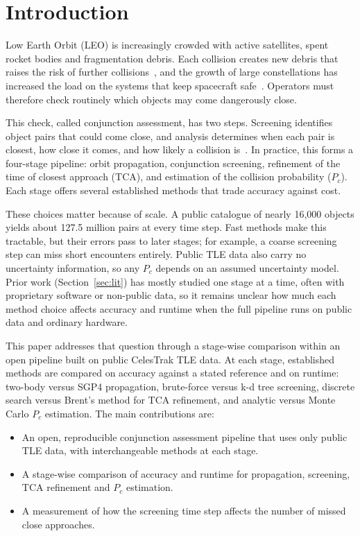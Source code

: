 \documentclass[runningheads]{llncs}
\begin{document}
\section{Introduction}

Low Earth Orbit (LEO) is increasingly crowded with active satellites, spent rocket bodies and fragmentation debris. Each collision creates new debris that raises the risk of further collisions~\cite{b1}, and the growth of large constellations has increased the load on the systems that keep spacecraft safe~\cite{b3}. Operators must therefore check routinely which objects may come dangerously close.

This check, called conjunction assessment, has two steps. Screening identifies object pairs that could come close, and analysis determines when each pair is closest, how close it comes, and how likely a collision is~\cite{b7}. In practice, this forms a four-stage pipeline: orbit propagation, conjunction screening, refinement of the time of closest approach (TCA), and estimation of the collision probability ($P_c$). Each stage offers several established methods that trade accuracy against cost.

These choices matter because of scale. A public catalogue of nearly 16,000 objects yields about 127.5 million pairs at every time step. Fast methods make this tractable, but their errors pass to later stages; for example, a coarse screening step can miss short encounters entirely. Public TLE data also carry no uncertainty information, so any $P_c$ depends on an assumed uncertainty model. Prior work (Section~\ref{sec:lit}) has mostly studied one stage at a time, often with proprietary software or non-public data, so it remains unclear how much each method choice affects accuracy and runtime when the full pipeline runs on public data and ordinary hardware.

This paper addresses that question through a stage-wise comparison within an open pipeline built on public CelesTrak TLE data. At each stage, established methods are compared on accuracy against a stated reference and on runtime: two-body versus SGP4 propagation, brute-force versus k-d tree screening, discrete search versus Brent's method for TCA refinement, and analytic versus Monte Carlo $P_c$ estimation. The main contributions are:
\begin{itemize}
\item An open, reproducible conjunction assessment pipeline that uses only public TLE data, with interchangeable methods at each stage.
\item A stage-wise comparison of accuracy and runtime for propagation, screening, TCA refinement and $P_c$ estimation.
\item A measurement of how the screening time step affects the number of missed close approaches.
\end{itemize}
\end{document}
